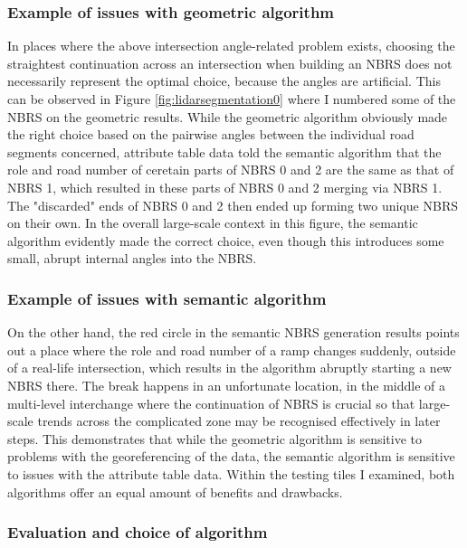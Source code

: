 \subsubsection{Example of issues with geometric algorithm}

In places where the above intersection angle-related problem exists, choosing the straightest continuation across an intersection when building an NBRS does not necessarily represent the optimal choice, because the angles are artificial. This can be observed in Figure \ref{fig:lidarsegmentation0} where I numbered some of the NBRS on the geometric results. While the geometric algorithm obviously made the right choice based on the pairwise angles between the individual road segments concerned, attribute table data told the semantic algorithm that the role and road number of ceretain parts of NBRS 0 and 2 are the same as that of NBRS 1, which resulted in these parts of NBRS 0 and 2 merging via NBRS 1. The "discarded" ends of NBRS 0 and 2 then ended up forming two unique NBRS on their own. In the overall large-scale context in this figure, the semantic algorithm evidently made the correct choice, even though this introduces some small, abrupt internal angles into the NBRS.

\subsubsection{Example of issues with semantic algorithm}

On the other hand, the red circle in the semantic NBRS generation results points out a place where the role and road number of a ramp changes suddenly, outside of a real-life intersection, which results in the algorithm abruptly starting a new NBRS there. The break happens in an unfortunate location, in the middle of a multi-level interchange where the continuation of NBRS is crucial so that large-scale trends across the complicated zone may be recognised effectively in later steps. This demonstrates that while the geometric algorithm is sensitive to problems with the georeferencing of the data, the semantic algorithm is sensitive to issues with the attribute table data. Within the testing tiles I examined, both algorithms offer an equal amount of benefits and drawbacks.

\subsubsection{Evaluation and choice of algorithm}

